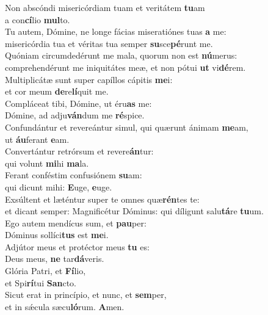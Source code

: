 \evenverse Non abscóndi misericórdiam tuam et veritátem \textbf{tu}am~\*\\
\evenverse a con\textbf{cí}lio \textbf{mul}to.\\
\oddverse Tu autem, Dómine, ne longe fácias miseratiónes tuas \textbf{a} me:~\*\\
\oddverse misericórdia tua et véritas tua semper \textbf{su}sce\textbf{pé}runt me.\\
\evenverse Quóniam circumdedérunt me mala, quorum non est \textbf{nú}merus:~\*\\
\evenverse comprehendérunt me iniquitátes meæ, et non pótui \textbf{ut} vi\textbf{dé}rem.\\
\oddverse Multiplicátæ sunt super capíllos cápitis \textbf{me}i:~\*\\
\oddverse et cor meum \textbf{de}re\textbf{lí}quit me.\\
\evenverse Compláceat tibi, Dómine, ut éru\textbf{as} me:~\*\\
\evenverse Dómine, ad adju\textbf{ván}dum me \textbf{ré}spice.\\
\oddverse Confundántur et revereántur simul, qui quærunt ánimam \textbf{me}am,~\*\\
\oddverse ut \textbf{áu}ferant \textbf{e}am.\\
\evenverse Convertántur retrórsum et revere\textbf{án}tur:~\*\\
\evenverse qui volunt \textbf{mi}hi \textbf{ma}la.\\
\oddverse Ferant conféstim confusiónem \textbf{su}am:~\*\\
\oddverse qui dicunt mihi: \textbf{E}uge, \textbf{e}uge.\\
\evenverse Exsúltent et læténtur super te omnes quæ\textbf{rén}tes te:~\*\\
\evenverse et dicant semper: Magnificétur Dóminus: qui díligunt salu\textbf{tá}re \textbf{tu}um.\\
\oddverse Ego autem mendícus sum, et \textbf{pau}per:~\*\\
\oddverse Dóminus sollíci\textbf{tus} est \textbf{me}i.\\
\evenverse Adjútor meus et protéctor meus \textbf{tu} es:~\*\\
\evenverse Deus meus, \textbf{ne} tar\textbf{dá}veris.\\
\oddverse Glória Patri, et \textbf{Fí}lio,~\*\\
\oddverse et Spi\textbf{rí}tui \textbf{San}cto.\\
\evenverse Sicut erat in princípio, et nunc, et \textbf{sem}per,~\*\\
\evenverse et in sǽcula sæcu\textbf{ló}rum. \textbf{A}men.\\
